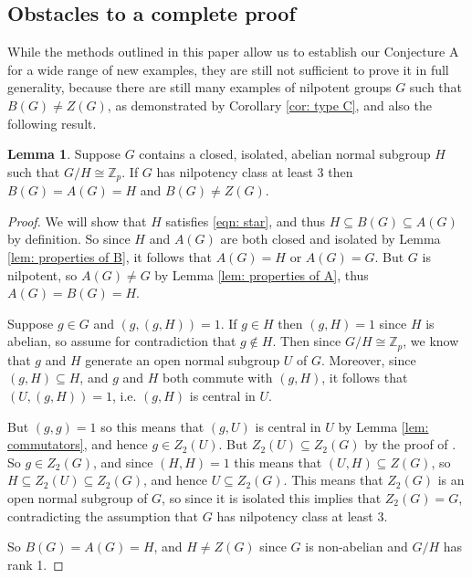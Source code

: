 \documentclass[12pt,a4paper]{article}
\theoremstyle{definition}
\newtheorem{lem}[thm]{Lemma}
\newtheorem{propn}[thm]{Proposition}
\theoremstyle{remark}
\theoremstyle{custthm}
\begin{document}




\subsection{Obstacles to a complete proof}

While the methods outlined in this paper allow us to establish our Conjecture A for a wide range of new examples, they are still not sufficient to prove it in full generality, because there are still many examples of nilpotent groups $G$ such that $B(G)\neq Z(G)$, as demonstrated by Corollary \ref{cor: type C}, and also the following result.

\begin{lem}\label{lem: abelian-by-one}
Suppose $G$ contains a closed, isolated, abelian normal subgroup $H$ such that $G/H\cong\mathbb{Z}_p$. If $G$ has nilpotency class at least 3 then $B(G)=A(G)=H$ and $B(G)\neq Z(G)$.
\end{lem}

\begin{proof}

We will show that $H$ satisfies \eqref{eqn: star}, and thus $H\subseteq B(G)\subseteq A(G)$ by definition. So since $H$ and $A(G)$ are both closed and isolated by Lemma \ref{lem: properties of B}, it follows that $A(G)=H$ or $A(G)=G$. But $G$ is nilpotent, so $A(G)\neq G$ by Lemma \ref{lem: properties of A}, thus $A(G)=B(G)=H$.

Suppose $g\in G$ and $(g,(g,H))=1$. If $g\in H$ then $(g,H)=1$ since $H$ is abelian, so assume for contradiction that $g\notin H$. Then since $G/H\cong\mathbb{Z}_p$, we know that $g$ and $H$ generate an open normal subgroup $U$ of $G$. Moreover, since $(g,H)\subseteq H$, and $g$ and $H$ both commute with $(g,H)$, it follows that $(U,(g,H))=1$, i.e. $(g,H)$ is central in $U$.

But $(g,g)=1$ so this means that $(g,U)$ is central in $U$ by Lemma \ref{lem: commutators}, and hence $g\in Z_2(U)$. But $Z_2(U)\subseteq Z_2(G)$ by the proof of \cite[Lemma 4.9]{jones-control-theorem}. So $g\in Z_2(G)$, and since $(H,H)=1$ this means that $(U,H)\subseteq Z(G)$, so $H\subseteq Z_2(U)\subseteq Z_2(G)$, and hence $U\subseteq Z_2(G)$. This means that $Z_2(G)$ is an open normal subgroup of $G$, so since it is isolated this implies that $Z_2(G)=G$, contradicting the assumption that $G$ has nilpotency class at least 3.


So $B(G)=A(G)=H$, and $H\neq Z(G)$ since $G$ is non-abelian and $G/H$ has rank 1.\end{proof}
\end{document}

